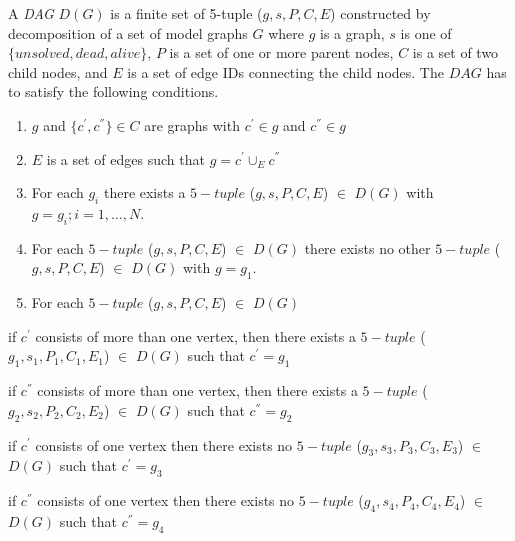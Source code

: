 \begin{definition}
A \emph{DAG}  $D(G)$  is a finite set of 5-tuple ($g,s,P,C,E$) constructed by decomposition of a set of model graphs $G$
where $g$ is a graph, $s$ is one of $\{unsolved, dead, alive\}$,  $P$ is a set of one or more parent nodes, $C$ is a set of two child nodes, and $E$ 
is a set of edge IDs connecting the child nodes. The $DAG$ has to satisfy the following conditions.
\begin{enumerate}[(1)]
\item $g$ and $\{c^{'} ,c^{''} \}\in C$ are graphs with $c^{'}\in g$ and $c^{''} \in g$
\item $E$ is a set of edges such that $g=c^{'}\cup_{E} c^{''}$
\item For each $g_{i}$ there exists a $5-tuple$ ($g,s,P,C,E$) $\in$ $D(G)$ with $g=g_i;i=1,\ldots,N$.
\item For each  $5-tuple$ ($g,s,P,C,E$) $\in$ $D(G)$ there exists no other  $5-tuple$ ($g,s,P,C,E$) $\in$ $D(G)$ with $g=g_1$.
\item For each  $5-tuple$ ($g,s,P,C,E$) $\in$ $D(G)$
\end{enumerate}

\newcommand{\indentitem}{\setlength\itemindent{25pt}}  

\begin{enumerate}[a.]
{\indentitem \item if $c^{'}$ consists of more than one vertex, then there exists a  $5-tuple$ ($g_1,s_1,P_1,C_1,E_1$) $\in$ $D(G)$ such that $c^{'}=g_1$ }
{\indentitem \item if $c^{''}$ consists of more than one vertex, then there exists a  $5-tuple$ ($g_2,s_2,P_2,C_2,E_2$) $\in$ $D(G)$ such that $c^{''}=g_2$ }
{\indentitem \item if $c^{'}$ consists of one vertex then there exists no  $5-tuple$ ($g_3,s_3,P_3,C_3,E_3$) $\in$ $D(G)$ such that $c^{'}=g_3$ }
{\indentitem \item if $c^{''}$ consists of one vertex then there exists no  $5-tuple$ ($g_4,s_4,P_4,C_4,E_4$) $\in$ $D(G)$ such that $c^{''}=g_4$ }
\end{enumerate}
\end{definition}

